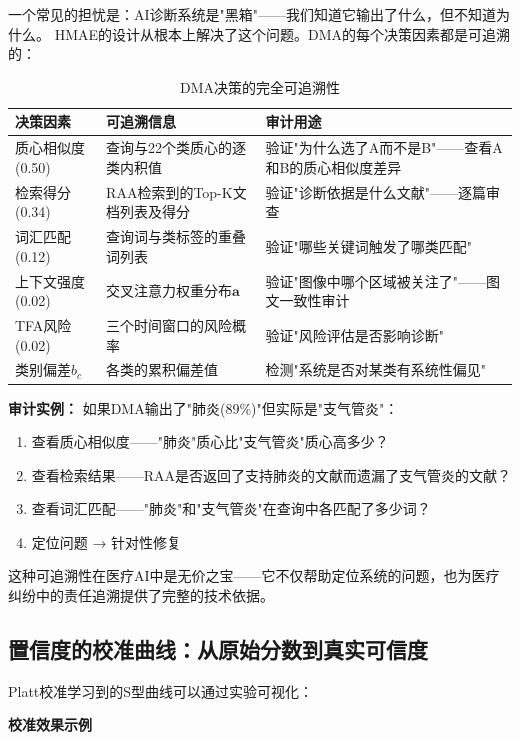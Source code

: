 \documentclass[11pt,a4paper]{ctexart}
\begin{document}
一个常见的担忧是：AI诊断系统是"黑箱"——我们知道它输出了什么，但不知道为什么。
HMAE的设计从根本上解决了这个问题。DMA的每个决策因素都是可追溯的：

\begin{table}[H]
\centering
\small
\begin{tabular}{p{3cm}p{4cm}p{6.5cm}}
\toprule
\textbf{决策因素} & \textbf{可追溯信息} & \textbf{审计用途} \\
\midrule
质心相似度(0.50) & 查询与22个类质心的逐类内积值 & 验证"为什么选了A而不是B"——查看A和B的质心相似度差异 \\
检索得分(0.34) & RAA检索到的Top-K文档列表及得分 & 验证"诊断依据是什么文献"——逐篇审查 \\
词汇匹配(0.12) & 查询词与类标签的重叠词列表 & 验证"哪些关键词触发了哪类匹配" \\
上下文强度(0.02) & 交叉注意力权重分布$\mathbf{a}$ & 验证"图像中哪个区域被关注了"——图文一致性审计 \\
TFA风险(0.02) & 三个时间窗口的风险概率 & 验证"风险评估是否影响诊断" \\
类别偏差$b_c$ & 各类的累积偏差值 & 检测"系统是否对某类有系统性偏见" \\
\bottomrule
\end{tabular}
\caption{DMA决策的完全可追溯性}
\end{table}

\textbf{审计实例：} 如果DMA输出了"肺炎(89\%)"但实际是"支气管炎"：
\begin{enumerate}[nosep]
\item 查看质心相似度——"肺炎"质心比"支气管炎"质心高多少？
\item 查看检索结果——RAA是否返回了支持肺炎的文献而遗漏了支气管炎的文献？
\item 查看词汇匹配——"肺炎"和"支气管炎"在查询中各匹配了多少词？
\item 定位问题 → 针对性修复
\end{enumerate}

这种可追溯性在医疗AI中是无价之宝——它不仅帮助定位系统的问题，也为医疗纠纷中的责任追溯提供了完整的技术依据。

\subsection{置信度的校准曲线：从原始分数到真实可信度}

Platt校准学习到的S型曲线可以通过实验可视化：

\begin{center}
\textbf{校准效果示例}
\end{center}
\end{document}
